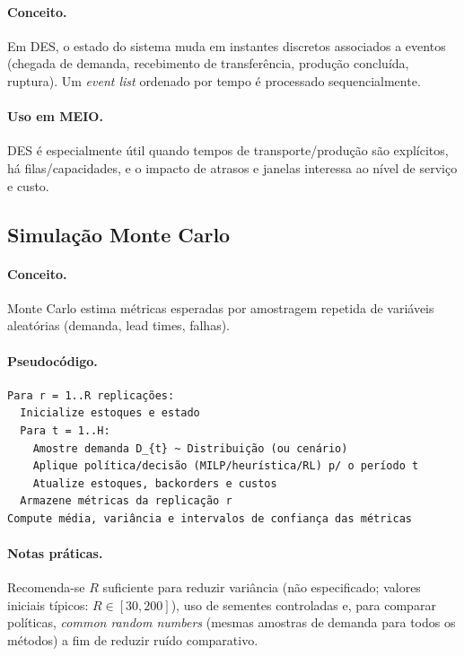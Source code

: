 \paragraph{Conceito.}
Em DES, o estado do sistema muda em instantes discretos associados a eventos (chegada de demanda, recebimento de transferência, produção concluída, ruptura). Um \emph{event list} ordenado por tempo é processado sequencialmente. \cite{Law2015SimulationModeling}

\paragraph{Uso em MEIO.}
DES é especialmente útil quando tempos de transporte/produção são explícitos, há filas/capacidades, e o impacto de atrasos e janelas interessa ao nível de serviço e custo.

\subsection{Simulação Monte Carlo}

\paragraph{Conceito.}
Monte Carlo estima métricas esperadas por amostragem repetida de variáveis aleatórias (demanda, lead times, falhas). \cite{Law2015SimulationModeling}

\paragraph{Pseudocódigo.}
\begin{verbatim}
Para r = 1..R replicações:
  Inicialize estoques e estado
  Para t = 1..H:
    Amostre demanda D_{t} ~ Distribuição (ou cenário)
    Aplique política/decisão (MILP/heurística/RL) p/ o período t
    Atualize estoques, backorders e custos
  Armazene métricas da replicação r
Compute média, variância e intervalos de confiança das métricas
\end{verbatim}

\paragraph{Notas práticas.}
Recomenda-se \(R\) suficiente para reduzir variância (não especificado; valores iniciais típicos: \(R\in[30,200]\)), uso de sementes controladas e, para comparar políticas, \emph{common random numbers} (mesmas amostras de demanda para todos os métodos) a fim de reduzir ruído comparativo. \cite{Law2015SimulationModeling}

